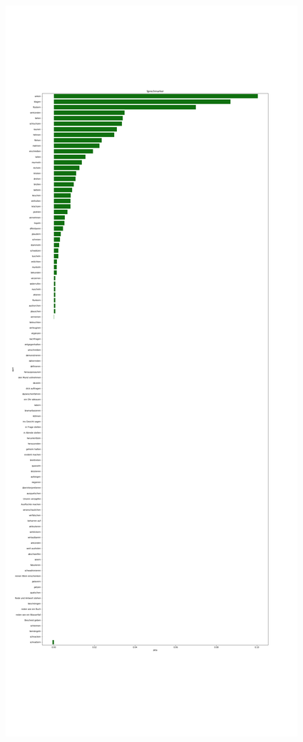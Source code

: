 \documentclass[a4paper,10p]{article}
\begin{document}
\begin{figure}{}
    \centering
    \begin{minipage}[b]{.45\linewidth}
        \centering
        \includegraphics[width=\linewidth]{haupt_sprechmarker_pro_wort.png}

\end{minipage}
\end{figure}
\end{document}
